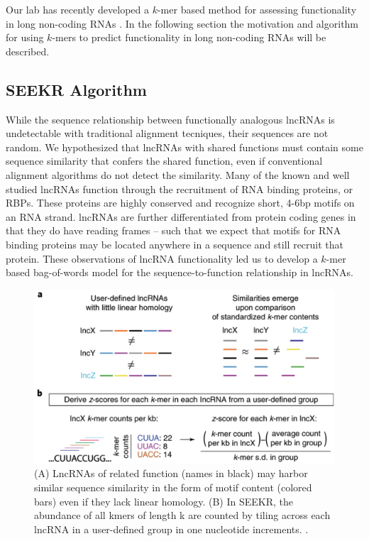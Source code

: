 Our lab has recently developed a $k$-mer based method for assessing functionality in long non-coding RNAs \cite{Kirk2018FunctionalContent}. In the following section the motivation and algorithm for using $k$-mers to predict functionality in long non-coding RNAs will be described. 

\subsection{SEEKR Algorithm}

 While the sequence relationship between functionally analogous lncRNAs is undetectable with traditional alignment tecniques, their sequences are not random. We hypothesized that lncRNAs with shared functions must contain some sequence similarity that confers the shared function, even if conventional alignment algorithms do not detect the similarity. Many of the known and well studied lncRNAs function through the recruitment of RNA binding proteins, or RBPs. These proteins are highly conserved and recognize short, 4-6bp motifs on an RNA strand. lncRNAs are further differentiated from protein coding genes in that they do have reading frames -- such that we expect that motifs for RNA binding proteins may be located anywhere in a sequence and still recruit that protein. These observations of lncRNA functionality led us to develop a $k$-mer based bag-of-words model for the sequence-to-function relationship in lncRNAs.
 
 \begin{figure}[t!]
\centering
\includegraphics[width=.8\textwidth]{images/seekrclip.png}
\caption[width=.8\textwidth]{(A) LncRNAs of related function (names in black) may harbor similar sequence similarity in the form of motif content (colored bars) even if they lack linear homology. (B) In SEEKR, the abundance of all kmers of length k are counted by tiling across each lncRNA in a user-defined group in one nucleotide increments. \cite{Kirk2018FunctionalContent}.}
\label{fig:seekr}
\end{figure}

